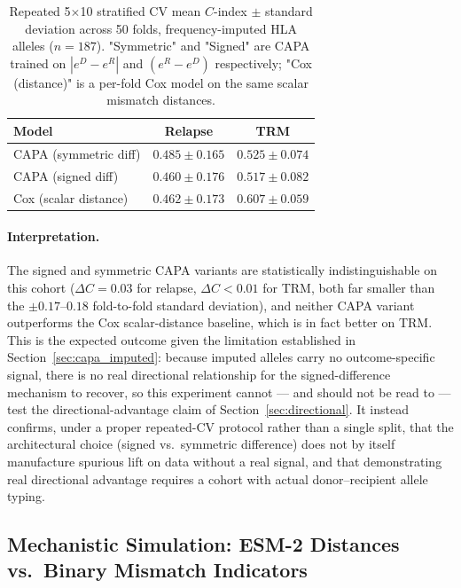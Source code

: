 \documentclass[11pt,a4paper]{article}
\begin{document}
\begin{table}[t!]
  \caption{Repeated 5$\times$10 stratified CV mean $C$-index $\pm$ standard
    deviation across 50 folds, frequency-imputed HLA alleles ($n=187$).
    "Symmetric" and "Signed" are CAPA trained on $|e^D-e^R|$ and $(e^R-e^D)$
    respectively; "Cox (distance)" is a per-fold Cox model on the same scalar
    mismatch distances.}
  \label{tab:cv_diffmode}
  \begin{tabular}{lcc}
    \toprule
    \textbf{Model} & \textbf{Relapse} & \textbf{TRM} \\
    \midrule
    CAPA (symmetric diff)  & $0.485 \pm 0.165$ & $0.525 \pm 0.074$ \\
    CAPA (signed diff)     & $0.460 \pm 0.176$ & $0.517 \pm 0.082$ \\
    Cox (scalar distance)  & $0.462 \pm 0.173$ & $0.607 \pm 0.059$ \\
    \bottomrule
  \end{tabular}
\end{table}

\paragraph{Interpretation.}
The signed and symmetric CAPA variants are statistically indistinguishable on
this cohort ($\Delta C = 0.03$ for relapse, $\Delta C < 0.01$ for TRM, both
far smaller than the $\pm 0.17$--$0.18$ fold-to-fold standard deviation), and
neither CAPA variant outperforms the Cox scalar-distance baseline, which is
in fact better on TRM.  This is the expected outcome given the limitation
established in Section~\ref{sec:capa_imputed}: because imputed alleles carry
no outcome-specific signal, there is no real directional relationship for the
signed-difference mechanism to recover, so this experiment cannot --- and
should not be read to --- test the directional-advantage claim of
Section~\ref{sec:directional}. It instead confirms, under a proper repeated-CV
protocol rather than a single split, that the architectural choice (signed
vs.\ symmetric difference) does not by itself manufacture spurious lift on
data without a real signal, and that demonstrating real directional
advantage requires a cohort with actual donor--recipient allele typing.

\subsection{Mechanistic Simulation: ESM-2 Distances vs.\ Binary Mismatch Indicators}
\label{sec:mechanistic}
\end{document}
